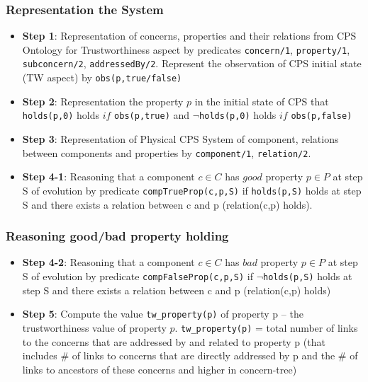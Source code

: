 \documentclass{beamer}
\begin{document}
\begin{frame}[fragile]
	\frametitle{Representation the System}
	\begin{itemize}
		\item {\bf Step 1}: Representation of concerns, properties and their relations from CPS Ontology for Trustworthiness aspect by predicates {\tt concern/1}, {\tt property/1}, {\tt subconcern/2}, {\tt addressedBy/2}. Represent the observation of CPS initial state (TW aspect) by {\tt obs(p,true/false)}
		\item {\bf Step 2}: Representation the property $p$ in the initial state of CPS that {\tt holds(p,0)} holds $if$ {\tt obs(p,true)} and {\tt $\neg$holds(p,0)} holds $if$ {\tt obs(p,false)}
		\item {\bf Step 3}: Representation of Physical CPS System of component, relations between components and properties by {\tt component/1}, {\tt relation/2}.
		\item {\bf Step 4-1}: Reasoning that a component $c \in C$ has $good$ property $p \in P$ at step S of evolution by predicate {\tt compTrueProp(c,p,S)} if {\tt holds(p,S)} holds at step S and there exists a relation between c and p (relation(c,p) holds). 	   
	\end{itemize}
\end{frame}

\begin{frame}[fragile]
	\frametitle{Reasoning good/bad property holding}
	\begin{itemize}
		\item {\bf Step 4-2}: Reasoning that a component $c \in C$ has $bad$ property $p \in P$ at step S of evolution by predicate {\tt compFalseProp(c,p,S)} if {\tt $\neg$holds(p,S)} holds at step S and there exists a relation between c and p (relation(c,p) holds)
		\item {\bf Step 5}: Compute the value {\tt tw\_property(p)} of property p -- the trustworthiness value of property $p$. {\tt tw\_property(p)} = total number of links to the concerns that are addressed by and related to property p (that includes \# of links to concerns that are directly addressed by p and the \# of links to ancestors of these concerns and higher in concern-tree)
	\end{itemize}
\end{frame}
\end{document}
